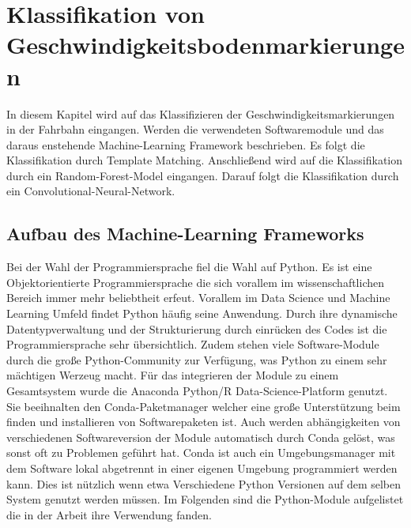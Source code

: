 %

\chapter{Klassifikation von Geschwindigkeitsbodenmarkierungen}
\label{cha:Klassifikation von Geschwindigkeitsbodenmarkierungen} 
%
%

In diesem Kapitel wird auf das Klassifizieren der Geschwindigkeitsmarkierungen in der Fahrbahn eingangen. Werden die verwendeten Softwaremodule und das daraus enstehende Machine-Learning Framework beschrieben. Es folgt die Klassifikation durch Template Matching. Anschlie{\ss}end wird auf die Klassifikation durch ein Random-Forest-Model eingangen. Darauf folgt die Klassifikation durch ein Convolutional-Neural-Network.

\section{Aufbau des Machine-Learning Frameworks}
\label{sec:Aufbau des Machine-Learning Frameworks}

Bei der Wahl der Programmiersprache fiel die Wahl auf Python. Es ist eine Objektorientierte Programmiersprache die sich vorallem im wissenschaftlichen Bereich immer mehr beliebtheit erfeut. Vorallem im Data Science und Machine Learning Umfeld findet Python h{\"a}ufig seine Anwendung. Durch ihre dynamische Datentypverwaltung und der Strukturierung durch einr{\"u}cken des Codes ist die Programmiersprache sehr {\"u}bersichtlich. Zudem stehen viele Software-Module durch die gro{\ss}e Python-Community zur Verf{\"u}gung, was Python zu einem sehr m{\"a}chtigen Werzeug macht.
F{\"u}r das integrieren der Module zu einem Gesamtsystem wurde die Anaconda Python/R Data-Science-Platform genutzt. Sie beeihnalten den Conda-Paketmanager welcher eine gro{\ss}e Unterst{\"u}tzung beim finden und installieren von Softwarepaketen ist. Auch werden abh{\"a}ngigkeiten von verschiedenen Softwareversion der Module automatisch durch Conda gel{\"o}st, was sonst oft zu Problemen gef{\"u}hrt hat. Conda ist auch ein Umgebungsmanager mit dem Software lokal abgetrennt in einer eigenen Umgebung programmiert werden kann. Dies ist n{\"u}tzlich wenn etwa Verschiedene Python Versionen auf dem selben System genutzt werden m{\"u}ssen.
Im Folgenden sind die Python-Module aufgelistet die in der Arbeit ihre Verwendung fanden.

